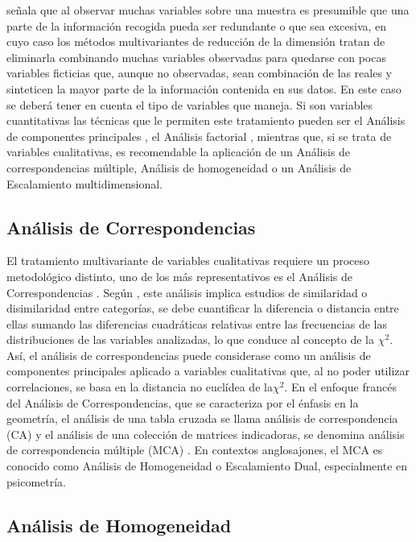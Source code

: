 \documentclass[water,article,submit,moreauthors,pdftex]{mdpi}
\begin{document}
\citet{perez2004} señala que al observar muchas variables sobre una
muestra es presumible que una parte de la información recogida pueda ser
redundante o que sea excesiva, en cuyo caso los métodos multivariantes
de reducción de la dimensión tratan de eliminarla combinando muchas
variables observadas para quedarse con pocas variables ficticias que,
aunque no observadas, sean combinación de las reales y sinteticen la
mayor parte de la información contenida en sus datos. En este caso se
deberá tener en cuenta el tipo de variables que maneja. Si son variables
cuantitativas las técnicas que le permiten este tratamiento pueden ser
el Análisis de componentes principales
\citep{Person1901, Hotelling1933}, el Análisis factorial
\citep{ch1904, thurstone1947, kaiser1958}, mientras que, si se trata de
variables cualitativas, es recomendable la aplicación de un Análisis de
correspondencias múltiple, Análisis de homogeneidad o un Análisis de
Escalamiento multidimensional.

\hypertarget{anuxe1lisis-de-correspondencias}{%
\subsection{Análisis de
Correspondencias}\label{anuxe1lisis-de-correspondencias}}

El tratamiento multivariante de variables cualitativas requiere un
proceso metodológico distinto, uno de los más representativos es el
Análisis de Correspondencias \citep{Benzecri}. Según \citep{perez2004},
este análisis implica estudios de similaridad o disimilaridad entre
categorías, se debe cuantificar la diferencia o distancia entre ellas
sumando las diferencias cuadráticas relativas entre las frecuencias de
las distribuciones de las variables analizadas, lo que conduce al
concepto de la \(\chi^2\). Así, el análisis de correspondencias puede
considerase como un análisis de componentes principales aplicado a
variables cualitativas que, al no poder utilizar correlaciones, se basa
en la distancia no euclídea de la\(\chi^2\). En el enfoque francés del
Análisis de Correspondencias, que se caracteriza por el énfasis en la
geometría, el análisis de una tabla cruzada se llama análisis de
correspondencia (CA) y el análisis de una colección de matrices
indicadoras, se denomina análisis de correspondencia múltiple (MCA)
\citep{michailidis1998}. En contextos anglosajones, el MCA es conocido
como Análisis de Homogeneidad o Escalamiento Dual, especialmente en
psicometría.

\hypertarget{anuxe1lisis-de-homogeneidad}{%
\subsection{Análisis de
Homogeneidad}\label{anuxe1lisis-de-homogeneidad}}
\end{document}
